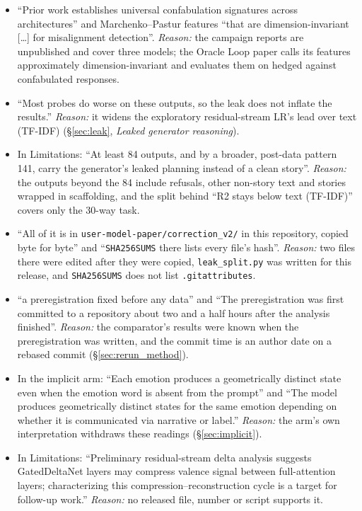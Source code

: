 \begin{enumerate}[leftmargin=*]
\begin{itemize}[nosep]
        \item ``Prior work establishes universal confabulation signatures across architectures'' and Marchenko--Pastur features ``that are dimension-invariant [\ldots] for misalignment detection''. \emph{Reason:} the campaign reports are unpublished and cover three models; the Oracle Loop paper calls its features approximately dimension-invariant and evaluates them on hedged against confabulated responses.
        \item ``Most probes do worse on these outputs, so the leak does not inflate the results.'' \emph{Reason:} it widens the exploratory residual-stream LR's lead over text (TF-IDF) (\S\ref{sec:leak}, \emph{Leaked generator reasoning}).
        \item In Limitations: ``At least 84 outputs, and by a broader, post-data pattern 141, carry the generator's leaked planning instead of a clean story''. \emph{Reason:} the outputs beyond the 84 include refusals, other non-story text and stories wrapped in scaffolding, and the split behind ``R2 stays below text (TF-IDF)'' covers only the 30-way task.
        \item ``All of it is in \texttt{user-model-paper/correction\_v2/} in this repository, copied byte for byte'' and ``\texttt{SHA256SUMS} there lists every file's hash''. \emph{Reason:} two files there were edited after they were copied, \texttt{leak\_split.py} was written for this release, and \texttt{SHA256SUMS} does not list \texttt{.gitattributes}.
        \item ``a preregistration fixed before any data'' and ``The preregistration was first committed to a repository about two and a half hours after the analysis finished''. \emph{Reason:} the comparator's results were known when the preregistration was written, and the commit time is an author date on a rebased commit (\S\ref{sec:rerun_method}).
        \item In the implicit arm: ``Each emotion produces a geometrically distinct state even when the emotion word is absent from the prompt'' and ``The model produces geometrically distinct states for the same emotion depending on whether it is communicated via narrative or label.'' \emph{Reason:} the arm's own interpretation withdraws these readings (\S\ref{sec:implicit}).
        \item In Limitations: ``Preliminary residual-stream delta analysis suggests GatedDeltaNet layers may compress valence signal between full-attention layers; characterizing this compression--reconstruction cycle is a target for follow-up work.'' \emph{Reason:} no released file, number or script supports it.

\end{itemize}
\end{enumerate}
